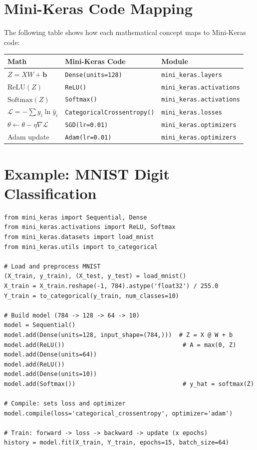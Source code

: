 \documentclass[12pt, a4paper]{report}
\theoremstyle{definition}
\begin{document}
\section{Mini-Keras Code Mapping}

The following table shows how each mathematical concept maps to Mini-Keras code:

\begin{center}
\renewcommand{\arraystretch}{1.5}
\begin{tabular}{lll}
\toprule
\textbf{Math} & \textbf{Mini-Keras Code} & \textbf{Module} \\
\midrule
$Z = XW + \mathbf{b}$ & \texttt{Dense(units=128)} & \texttt{mini\_keras.layers} \\
$\text{ReLU}(Z)$ & \texttt{ReLU()} & \texttt{mini\_keras.activations} \\
$\text{Softmax}(Z)$ & \texttt{Softmax()} & \texttt{mini\_keras.activations} \\
$\mathcal{L} = -\sum y_i \ln \hat{y}_i$ & \texttt{CategoricalCrossentropy()} & \texttt{mini\_keras.losses} \\
$\theta \leftarrow \theta - \eta \nabla \mathcal{L}$ & \texttt{SGD(lr=0.01)} & \texttt{mini\_keras.optimizers} \\
Adam update & \texttt{Adam(lr=0.01)} & \texttt{mini\_keras.optimizers} \\
\bottomrule
\end{tabular}
\end{center}

\section{Example: MNIST Digit Classification}

\begin{lstlisting}
from mini_keras import Sequential, Dense
from mini_keras.activations import ReLU, Softmax
from mini_keras.datasets import load_mnist
from mini_keras.utils import to_categorical

# Load and preprocess MNIST
(X_train, y_train), (X_test, y_test) = load_mnist()
X_train = X_train.reshape(-1, 784).astype('float32') / 255.0
Y_train = to_categorical(y_train, num_classes=10)

# Build model (784 -> 128 -> 64 -> 10)
model = Sequential()
model.add(Dense(units=128, input_shape=(784,)))  # Z = X @ W + b
model.add(ReLU())                                 # A = max(0, Z)
model.add(Dense(units=64))
model.add(ReLU())
model.add(Dense(units=10))
model.add(Softmax())                              # y_hat = softmax(Z)

# Compile: sets loss and optimizer
model.compile(loss='categorical_crossentropy', optimizer='adam')

# Train: forward -> loss -> backward -> update (x epochs)
history = model.fit(X_train, Y_train, epochs=15, batch_size=64)
\end{lstlisting}
\end{document}
